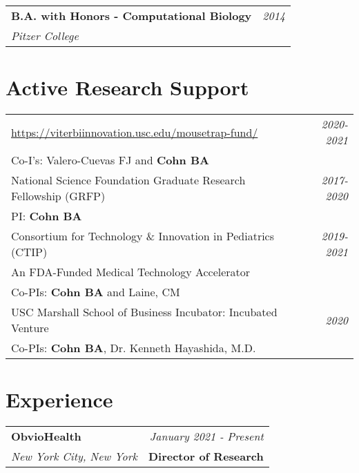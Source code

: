 \documentclass[10pt,a4paper]{article}
\begin{document}
  \vspace*{1mm}\noindent\begin{tabularx}{17cm}{X r}
    \textbf{B.A. with Honors - Computational Biology} & \textit{2014} \\
    \textit{Pitzer College}
  \end{tabularx}

  \vspace*{2mm}\section*{Active Research Support}

  \vspace*{1mm}\noindent\begin{tabularx}{17cm}{X r}
    \href{USC Viterbi School of Engineering: Mousetrap Grant}{https://viterbiinnovation.usc.edu/mousetrap-fund/}  & \textit{2020-2021} \\
    Co-I's: Valero-Cuevas FJ and \textbf{Cohn BA} \\
    \vspace*{1mm}
    National Science Foundation Graduate Research Fellowship (GRFP) & \textit{2017-2020} \\
    PI: \textbf{Cohn BA} \\
    \vspace*{1mm}
    Consortium for Technology \& Innovation in Pediatrics (CTIP) & \textit{2019-2021} \\
    An FDA-Funded Medical Technology Accelerator\\
    Co-PIs: \textbf{Cohn BA} and Laine, CM \\

    \vspace*{1mm}
    USC Marshall School of Business Incubator: Incubated Venture & \textit{2020} \\
    Co-PIs: \textbf{Cohn BA}, Dr. Kenneth Hayashida, M.D. \\

\end{tabularx}

\pagebreak
    \vspace*{6mm}\section*{Experience}
  
    \noindent\begin{tabularx}{17cm}{X r}
    \textbf{ObvioHealth} & \textit{January 2021 - Present} \\
    \textit{New York City, New York} & \textbf{Director of Research} \\
  \end{tabularx}
\end{document}
